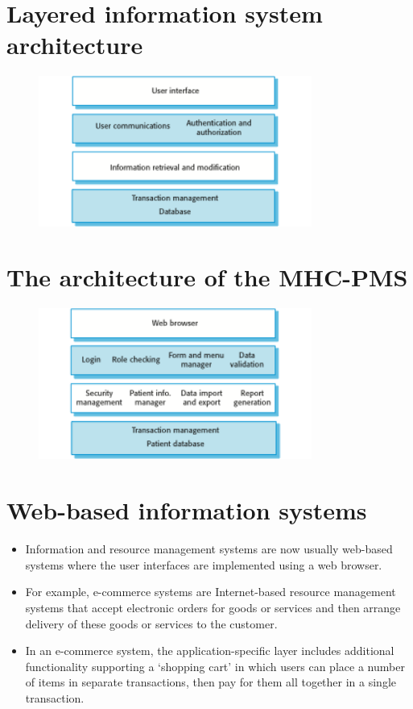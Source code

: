 \section{Layered information system architecture}
\begin{figure}[h!]
    \centering
    \includegraphics[width = 0.8\textwidth]{./figures/L3_11.png}
    \caption{}
    \label{fig:L3_11}
\end{figure}

\newpage
\section{The architecture of the MHC-PMS}
\begin{figure}[h!]
    \centering
    \includegraphics[width = 0.8\textwidth]{./figures/L3_12.png}
    \caption{}
    \label{fig:L3_12}
\end{figure}

\section{Web-based information systems}
\begin{itemize}
\item Information and resource management systems are now usually web-based systems where the user interfaces are implemented using a web browser.

\item For example, e-commerce systems are Internet-based resource management systems that accept electronic orders for goods or services and then arrange delivery of these goods or services to the customer.

\item In an e-commerce system, the application-specific layer includes additional functionality supporting a ‘shopping cart’ in which users can place a number of items in separate transactions, then pay for them all together in a single transaction.

\end{itemize}
